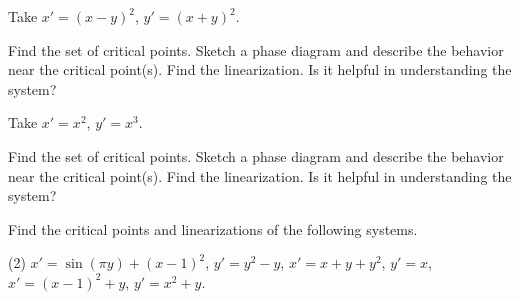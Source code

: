 \begin{exercise}
Take $x'=(x-y)^2$, \enspace $y'=(x+y)^2$. 
\begin{tasks}
\task Find the set of critical points.
\task Sketch a phase diagram and describe the behavior near the critical
point(s).
\task Find the linearization.  Is it helpful in understanding the system?
\end{tasks}
\end{exercise}

\begin{exercise}
Take $x'=x^2$, \enspace $y'=x^3$.
\begin{tasks}
\task Find the set of critical points.
\task Sketch a phase diagram and describe the behavior near the critical
point(s).
\task Find the linearization.  Is it helpful in understanding the system?
\end{tasks}
\end{exercise}

\setcounter{exercise}{100}

\pagebreak[2]
\begin{exercise}
Find the critical points and linearizations of the following systems.
\begin{tasks}(2)
\task $x'=\sin(\pi y)+(x-1)^2$, \enspace $y'=y^2-y$,
\task $x'=x+y+y^2$, \enspace $y'=x$,
\task $x'=(x-1)^2+y$, \enspace $y'=x^2+y$.
\end{tasks}
\end{exercise}

